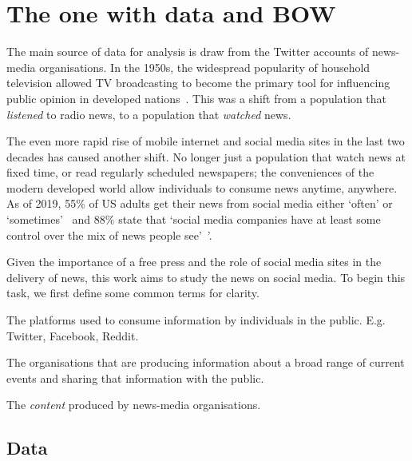 \chapter{The one with data and BOW\label{ch:intro}}



The main source of data for analysis is draw from the Twitter accounts of news-media organisations. In the 1950s, the widespread popularity of household television allowed TV broadcasting to become the primary tool for influencing public opinion in developed nations~.  This was a shift from a population that \emph{listened} to radio news, to a population that \emph{watched} news. 

The even more rapid rise of mobile internet and social media sites in the last two decades has caused another shift. No longer just a population that watch news at fixed time, or read regularly scheduled newspapers; the conveniences of the modern developed world allow individuals to consume news anytime, anywhere. As of 2019, 55\% of US adults get their news from social media either `often' or `sometimes'~ and 88\% state that `social media companies have at least some control over the mix of news people see'~'\cite{shearerAmericansAreWary2019}.

Given the importance of a free press and the role of social media sites in the delivery of news, this work aims to study the news on social media. To begin this task, we first define some common terms for clarity.

\begin{definition}
	The platforms used to consume information by individuals in the public. E.g. Twitter, Facebook, Reddit.
\end{definition}

\begin{definition}
	The organisations that are producing information about a broad range of current events and sharing that information with the public.
\end{definition}

\begin{definition}[News]
	The \emph{content} produced by news-media organisations. 
\end{definition}

\section{Data}

